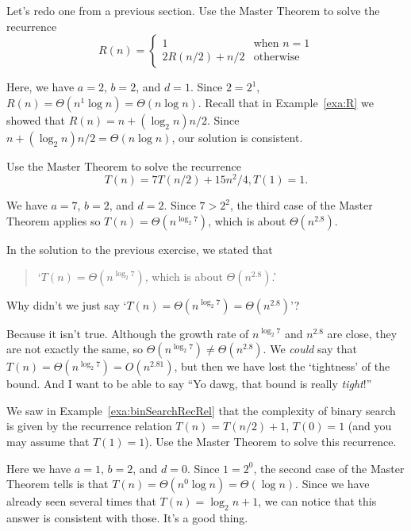 \begin{exa}
Let's redo one from a previous section.  
Use the Master Theorem to solve the recurrence 
$$
R(n) = \left\{ 
\begin{array}{ll}
1&\mbox{when $n = 1$}\\
2 R(n/2) + n/2 & \mbox{otherwise}
\end{array}
\right.
$$
\begin{sol}
Here, we have $a=2$, $b=2$, and $d=1$.  Since $2=2^1$, $R(n)=\Theta(n^1\log n)=\Theta(n\log n)$.
Recall that in Example~\ref{exa:R} we showed that $R(n)=n + (\log_2 n) n/2$. Since
$n + (\log_2 n) n/2=\Theta(n\log n)$, our solution is consistent.
\end{sol}
\end{exa}

\begin{exer}
Use the Master Theorem to solve the recurrence 
$$T(n)=7T(n/2)+15n^2/4, T(1)=1.$$
\vspace*{1.25in}
\begin{answer}
We have $a=7$, $b=2$, and $d=2$.  Since $7>2^2$, the third case of the
Master Theorem applies so $T(n)=\Theta(n^{\log_{2} 7})$, which is about $\Theta(n^{2.8})$.
\end{answer}
\end{exer}

\begin{ques}
In the solution to the previous exercise, we stated that
\begin{quote}
`$T(n)=\Theta(n^{\log_{2} 7})$, which is about $\Theta(n^{2.8})$.'
\end{quote}
Why didn't we just say 
`$T(n)=\Theta(n^{\log_{2} 7})=\Theta(n^{2.8})$'?

\noindent
\answerlinetwo
\begin{answer} 
Because it isn't true.  Although the growth rate of $n^{\log_{2} 7}$ and $n^{2.8}$ are
close, they are not exactly the same, so $\Theta(n^{\log_{2} 7})\neq \Theta(n^{2.8})$.
We {\em could} say that $T(n)=\Theta(n^{\log_{2} 7})=O(n^{2.81})$, but then we have lost
the `tightness' of the bound.  And I want to be able to say ``Yo dawg, that bound is really {\em tight}!''
\end{answer}
\end{ques}

\begin{exer}
We saw in Example~\ref{exa:binSearchRecRel} that the complexity of binary search is
given by the recurrence relation $T(n)=T(n/2)+1$, $T(0)=1$ (and you may assume that $T(1)=1$). 
Use the Master Theorem to solve this recurrence.

\vspace*{1.5in}
\begin{answer} 
Here we have $a=1$, $b=2$, and $d=0$.  Since $1=2^0$,
the second case of the Master Theorem tells is that $T(n)=\Theta(n^0\log n)=\Theta(\log n)$.
Since we have already seen several times that $T(n)=\log_2 n +1$, we can notice that 
this answer is consistent with those.  It's a good thing.
\end{answer}
\end{exer}

